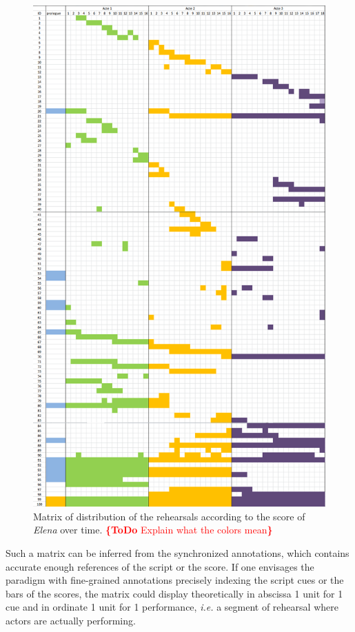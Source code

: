 \documentclass[conference]{IEEEtran}
\newcommand{\todo}[1]{\noindent\textcolor{red}{{\bf \{ToDo} #1{\bf \}}}}
\begin{document}
\begin{figure}[htb!]
  \centering
  \includegraphics[width=\columnwidth]{elenamatrix}
  \caption{Matrix of distribution of the rehearsals according to the score of \emph{Elena} over time. \todo{Explain what the colors mean}}
  \label{fig:elenamatrix}
\end{figure}

Such a matrix can be inferred from the synchronized annotations, which contains accurate enough references of the script or the score.  If one envisages the paradigm with fine-grained annotations precisely indexing the script cues or the bars of the scores, the matrix could display theoretically in abscissa 1 unit for 1 cue and in ordinate 1 unit for 1 performance, {\it i.e.} a segment of rehearsal where actors are actually performing. 
\end{document}
